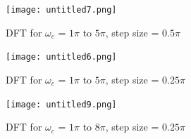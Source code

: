 \documentclass{article}
\begin{document}
\begin{figure}[h]
    \centering
    \texttt{[image: untitled7.png]}
    \caption{DFT for $\omega_c$ = $1\pi$ to $5\pi$, step size = $0.5\pi$}
    \label{fig:enter-label}
\end{figure}

\begin{figure}[h]
    \centering
    \texttt{[image: untitled6.png]}
    \caption{DFT for $\omega_c$ = $1\pi$ to $5\pi$, step size = $0.25\pi$}
    \label{fig:enter-label}
\end{figure}

\begin{figure}[h]
    \centering
    \texttt{[image: untitled9.png]}
    \caption{DFT for $\omega_c$ = $1\pi$ to $8\pi$, step size = $0.25\pi$}
    \label{fig:enter-label}
\end{figure}
\end{document}
